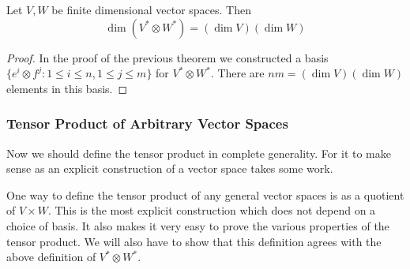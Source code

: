 \begin{cor}
    Let $V,W$ be finite dimensional vector spaces. Then 
    \[\dim (V^* \otimes W^*) = (\dim V) (\dim W)\]
\end{cor}
\begin{proof}
    In the proof of the previous theorem we constructed a basis $\{e^i\otimes f^j : 1\leq i\leq n, 1\leq j \leq m\}$ for $V^* \otimes W^*$. There are $nm = (\dim V)(\dim W)$ elements in this basis.
\end{proof}
\subsubsection{Tensor Product of Arbitrary Vector Spaces}
Now we should define the tensor product in complete generality. For it to make sense as an explicit construction of a vector space takes some work.

One way to define the tensor product of any general vector spaces is as a quotient of $V\times W$. This is the most explicit construction which does not depend on a choice of basis. It also makes it very easy to prove the various properties of the tensor product. We will also have to show that this definition agrees with the above definition of $V^* \otimes W^*$.

